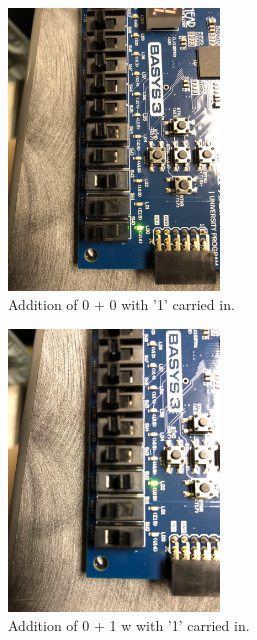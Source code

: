 \documentclass[11pt]{article}
\begin{document}
\begin{figure}[H]
\begin{center}
\includegraphics[width=0.5\textwidth]{report-images/Part3/IMG_0453.jpg}
\caption{Addition of 0 + 0  with '1' carried in.}
\label{fig:fullAdderImgFive}
\end{center}
\end{figure}

\begin{figure}[H]
\begin{center}
\includegraphics[width=0.5\textwidth]{report-images/Part3/IMG_0454.jpg}
\caption{Addition of 0 + 1 w with '1' carried in.}
\label{fig:fullAdderImgSix}
\end{center}
\end{figure}
\end{document}
